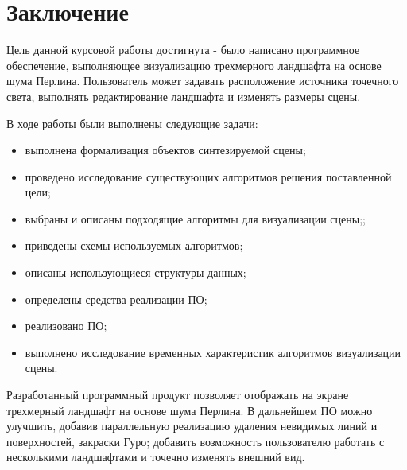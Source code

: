 \chapter*{Заключение}
Цель данной курсовой работы достигнута - было написано программное обеспечение, выполняющее визуализацию трехмерного ландшафта на основе шума Перлина. Пользователь может задавать расположение источника точечного света, выполнять редактирование ландшафта и изменять размеры сцены.

В ходе работы были выполнены следующие задачи:
\begin{itemize}
	\item выполнена формализация объектов синтезируемой сцены;
	\item проведено исследование существующих алгоритмов решения поставленной цели;
	\item выбраны и описаны подходящие алгоритмы для визуализации сцены;;
	\item приведены схемы используемых алгоритмов;
	\item описаны использующиеся структуры данных;
	\item определены средства реализации ПО;
	\item реализовано ПО;
	\item выполнено исследование временных характеристик алгоритмов визуализации сцены.
\end{itemize}

Разработанный программный продукт позволяет отображать на экране трехмерный ландшафт на основе шума Перлина. В дальнейшем ПО можно улучшить, добавив параллельную реализацию удаления невидимых линий и поверхностей, закраски Гуро; добавить возможность пользователю работать с несколькими ландшафтами и точечно изменять внешний вид.